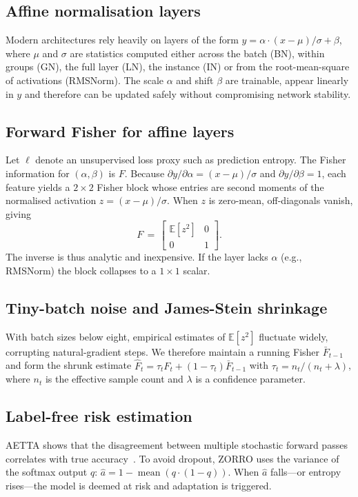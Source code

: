 \documentclass{article} %
\begin{document}
\subsection{Affine normalisation layers}
Modern architectures rely heavily on layers of the form \(y = \alpha\cdot(x - \mu)/\sigma + \beta\), where \(\mu\) and \(\sigma\) are statistics computed either across the batch (BN), within groups (GN), the full layer (LN), the instance (IN) or from the root-mean-square of activations (RMSNorm). The scale \(\alpha\) and shift \(\beta\) are trainable, appear linearly in \(y\) and therefore can be updated safely without compromising network stability.
\subsection{Forward Fisher for affine layers}
Let \(\ell\) denote an unsupervised loss proxy such as prediction entropy. The Fisher information for \((\alpha, \beta)\) is \(F\). Because \(\partial y/\partial \alpha = (x - \mu)/\sigma\) and \(\partial y/\partial \beta = 1\), each feature yields a \(2\times2\) Fisher block whose entries are second moments of the normalised activation \(z = (x - \mu)/\sigma\). When \(z\) is zero-mean, off-diagonals vanish, giving
\[
F \,=\, \begin{bmatrix} \mathbb{E}[z^2] & 0 \\ 0 & 1 \end{bmatrix}.
\]
The inverse is thus analytic and inexpensive. If the layer lacks \(\alpha\) (e.g., RMSNorm) the block collapses to a \(1\times1\) scalar.
\subsection{Tiny-batch noise and James-Stein shrinkage}
With batch sizes below eight, empirical estimates of \(\mathbb{E}[z^2]\) fluctuate widely, corrupting natural-gradient steps. We therefore maintain a running Fisher \(\bar{F}_{t-1}\) and form the shrunk estimate \(\hat{F}_{t} = \tau_{t} F_{t} + (1 - \tau_{t})\bar{F}_{t-1}\) with \(\tau_{t} = n_{t} /(n_{t} + \lambda)\), where \(n_{t}\) is the effective sample count and \(\lambda\) is a confidence parameter.
\subsection{Label-free risk estimation}
AETTA shows that the disagreement between multiple stochastic forward passes correlates with true accuracy~\cite{lee-2024-aetta}. To avoid dropout, ZORRO uses the variance of the softmax output \(q\): \(\hat{a} = 1 - \operatorname{mean}(q\cdot(1 - q))\). When \(\hat{a}\) falls---or entropy rises---the model is deemed at risk and adaptation is triggered.
\end{document}
